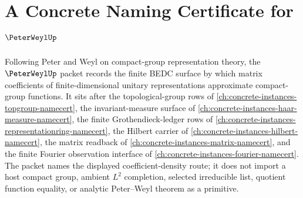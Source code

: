 \chapter{A Concrete Naming Certificate for $\PeterWeylUp$}
\label{ch:concrete-instances-peter-weyl-namecert}

Following Peter and Weyl on compact-group representation theory, the $\PeterWeylUp$ packet records the finite BEDC surface by which matrix coefficients of finite-dimensional unitary representations approximate compact-group functions. It sits after the topological-group rows of \autoref{ch:concrete-instances-topgroup-namecert}, the invariant-measure surface of \autoref{ch:concrete-instances-haar-measure-namecert}, the finite Grothendieck-ledger rows of \autoref{ch:concrete-instances-representationring-namecert}, the Hilbert carrier of \autoref{ch:concrete-instances-hilbert-namecert}, the matrix readback of \autoref{ch:concrete-instances-matrix-namecert}, and the finite Fourier observation interface of \autoref{ch:concrete-instances-fourier-namecert}. The packet names the displayed coefficient-density route; it does not import a host compact group, ambient $L^2$ completion, selected irreducible list, quotient function equality, or analytic Peter--Weyl theorem as a primitive.

